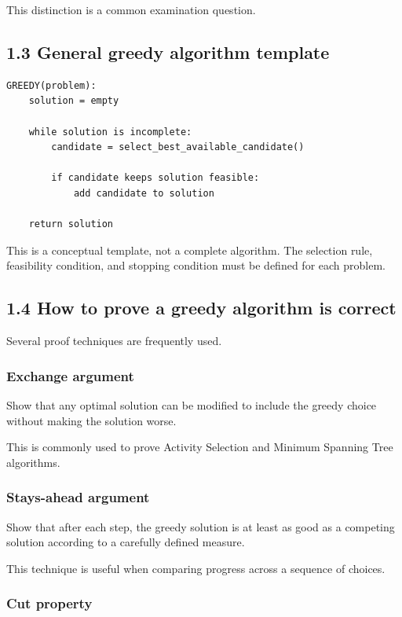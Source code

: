 This distinction is a common examination question.

\subsection{1.3 General greedy algorithm template}

\begin{lstlisting}[style=pseudocode]
GREEDY(problem):
    solution = empty

    while solution is incomplete:
        candidate = select_best_available_candidate()

        if candidate keeps solution feasible:
            add candidate to solution

    return solution
\end{lstlisting}

This is a conceptual template, not a complete algorithm. The selection rule, feasibility condition, and stopping condition must be defined for each problem.

\subsection{1.4 How to prove a greedy algorithm is correct}

Several proof techniques are frequently used.

\subsubsection{Exchange argument}

Show that any optimal solution can be modified to include the greedy choice without making the solution worse.

This is commonly used to prove Activity Selection and Minimum Spanning Tree algorithms.

\subsubsection{Stays-ahead argument}

Show that after each step, the greedy solution is at least as good as a competing solution according to a carefully defined measure.

This technique is useful when comparing progress across a sequence of choices.

\subsubsection{Cut property}

